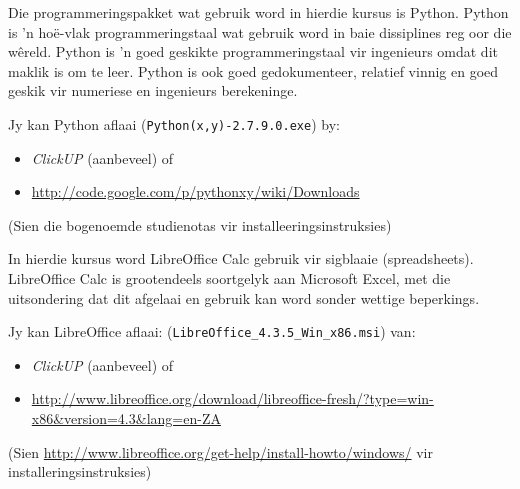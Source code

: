         Die programmeringspakket wat gebruik word in hierdie kursus is Python.
        Python is 'n ho\"{e}-vlak programmeringstaal wat gebruik word in baie
        dissiplines reg oor die w\^{e}reld. Python is 'n goed geskikte
        programmeringstaal vir ingenieurs omdat dit maklik is om te leer.
        Python is ook goed gedokumenteer, relatief vinnig en goed geskik vir
        numeriese en ingenieurs berekeninge.

        Jy kan Python aflaai ({\tt Python(x,y)-2.7.9.0.exe}) by:
        \begin{itemize}
            \item \textit{ClickUP} (aanbeveel) of
            \item \url{http://code.google.com/p/pythonxy/wiki/Downloads}
        \end{itemize}
        (Sien die bogenoemde studienotas vir installeeringsinstruksies)

        In hierdie kursus word LibreOffice Calc gebruik vir sigblaaie
        (spreadsheets).  LibreOffice Calc is grootendeels soortgelyk aan
        Microsoft Excel, met die uitsondering dat dit afgelaai en gebruik kan
        word sonder wettige beperkings.

        Jy kan LibreOffice aflaai:
        ({\tt  LibreOffice\_4.3.5\_Win\_x86.msi}) van:
        \begin{itemize}
            \item \textit{ClickUP} (aanbeveel) of
            \item \url{http://www.libreoffice.org/download/libreoffice-fresh/?type=win-x86&version=4.3&lang=en-ZA}
        \end{itemize}
        (Sien \url{http://www.libreoffice.org/get-help/install-howto/windows/}
        vir installeringsinstruksies)
